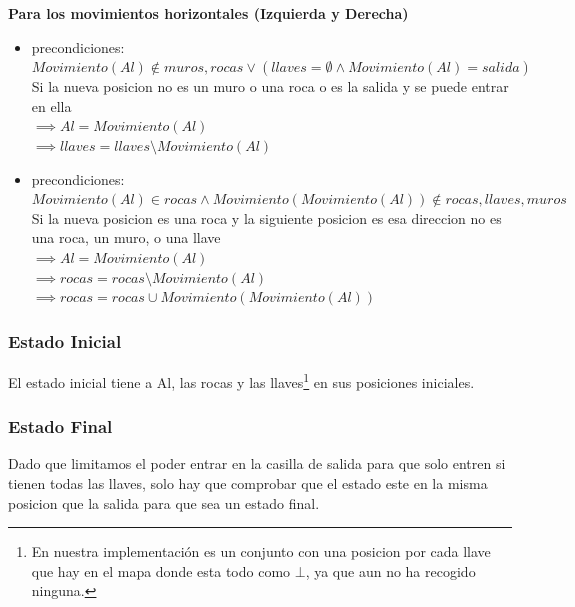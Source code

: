 \documentclass[11pt,spanish]{article}
\begin{document}
			\textbf{Para los movimientos horizontales (Izquierda y Derecha)}
			\begin{itemize}
				\item precondiciones: $Movimiento(Al) \notin muros, rocas \lor (llaves = \emptyset \land Movimiento(Al) = salida)$\\Si la nueva posicion no es un muro o una roca o es la salida y se puede entrar en ella\\
				$\implies Al = Movimiento(Al)$\\
				$\implies llaves = llaves\setminus Movimiento(Al)$
				\item precondiciones: $Movimiento(Al) \in rocas \land Movimiento(Movimiento(Al)) \notin rocas, llaves, muros$\\Si la nueva posicion es una roca y la siguiente posicion es esa direccion no es una roca, un muro, o una llave\\
				$\implies Al = Movimiento(Al)$\\
				$\implies rocas = rocas\setminus Movimiento(Al)$\\
				$\implies rocas = rocas \cup Movimiento(Movimiento(Al))$
			\end{itemize}
		\subsubsection{Estado Inicial}
			El estado inicial tiene a Al, las rocas y las llaves\footnote{En nuestra implementación es un conjunto con una posicion por cada llave que hay en el mapa donde esta todo como $\bot$, ya que aun no ha recogido ninguna.} en sus posiciones iniciales.
		\subsubsection{Estado Final}
			Dado que limitamos el poder entrar en la casilla de salida para que solo entren si tienen todas las llaves, solo hay que comprobar que el estado este en la misma posicion que la salida para que sea un estado final.
\end{document}
